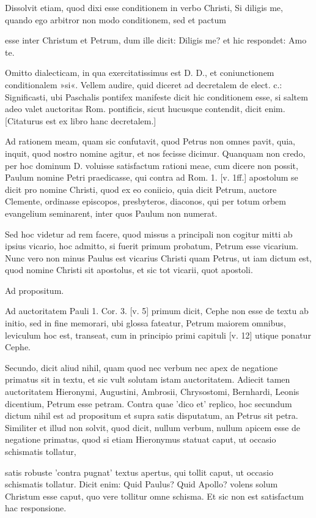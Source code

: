 Dissolvit etiam, quod dixi esse conditionem in verbo Christi, Si diligis me, quando ego arbitror non modo conditionem, sed et pactum

esse inter Christum et Petrum, dum ille dicit: Diligis me? et hic respondet: Amo te.

Omitto dialecticam, in qua exercitatissimus est D. D., et coniunctionem conditionalem »si«. Vellem audire, quid diceret ad decretalem de elect. c.: Significasti, ubi Paschalis pontifex manifeste dicit hic conditionem esse, si saltem adeo valet auctoritas Rom. pontificis, sicut hucusque contendit, dicit enim. [Citaturus est ex libro hanc decretalem.]

Ad rationem meam, quam sic confutavit, quod Petrus non omnes pavit, quia, inquit, quod nostro nomine agitur, et nos fecisse dicimur. Quanquam non credo, per hoc dominum D. voluisse satisfactum rationi meae, cum dicere non possit, Paulum nomine Petri praedicasse, qui contra ad Rom. 1. [v. 1ff.] apostolum se dicit pro nomine Christi, quod ex eo coniicio, quia dicit Petrum, auctore Clemente, ordinasse episcopos, presbyteros, diaconos, qui per totum orbem evangelium seminarent, inter quos Paulum non numerat.

Sed hoc videtur ad rem facere, quod missus a principali non cogitur mitti ab ipsius vicario, hoc admitto, si fuerit primum probatum, Petrum esse vicarium. Nunc vero non minus Paulus est vicarius Christi quam Petrus, ut iam dictum est, quod nomine Christi sit apostolus, et sic tot vicarii, quot apostoli.

Ad propositum.

Ad auctoritatem Pauli 1. Cor. 3. [v. 5] primum dicit, Cephe non esse de textu ab initio, sed in fine memorari, ubi glossa fateatur, Petrum maiorem omnibus, leviculum hoc est, transeat, cum in principio primi capituli [v. 12] utique ponatur Cephe.

Secundo, dicit aliud nihil, quam quod nec verbum nec apex de negatione primatus sit in textu, et sic vult solutam istam auctoritatem. Adiecit tamen auctoritatem Hieronymi, Augustini, Ambrosii, Chrysostomi, Bernhardi, Leonis dicentium, Petrum esse petram. Contra quae 'dico et' replico, hoc secundum dictum nihil est ad propositum et supra satis disputatum, an Petrus sit petra. Similiter et illud non solvit, quod dicit, nullum verbum, nullum apicem esse de negatione primatus, quod si etiam Hieronymus statuat caput, ut occasio schismatis tollatur,

satis robuste 'contra pugnat' textus apertus, qui tollit caput, ut occasio schismatis tollatur. Dicit enim: Quid Paulus? Quid Apollo? volens solum Christum esse caput, quo vere tollitur omne schisma. Et sic non est satisfactum hac responsione.

